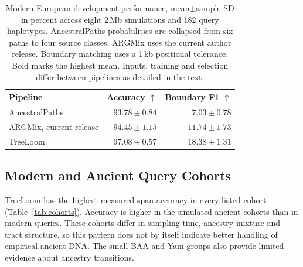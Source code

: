 \documentclass[letterpaper]{article}
\newcommand{\best}[1]{\mathbf{#1}}
\begin{document}
\begin{table}[t]
\centering
\small
\begin{tabular}{@{}lrr@{}}
\toprule
Pipeline & Accuracy $\uparrow$ & Boundary F1 $\uparrow$\\
\midrule
AncestralPaths &$93.78\pm0.84$&$7.03\pm0.78$\\
ARGMix, current release &$94.45\pm1.15$&$11.74\pm1.73$\\
TreeLoom &$\best{97.08\pm0.57}$&$\best{18.38\pm1.31}$\\
\bottomrule
\end{tabular}
\caption{Modern European development performance, mean$\pm$sample SD in percent across eight 2\,Mb simulations and 182 query haplotypes. AncestralPaths probabilities are collapsed from six paths to four source classes. ARGMix uses the current author release. Boundary matching uses a 1\,kb positional tolerance. Bold marks the highest mean. Inputs, training and selection differ between pipelines as detailed in the text.}
\label{tab:pipeline}
\end{table}

\subsection{Modern and Ancient Query Cohorts}
TreeLoom has the highest measured span accuracy in every listed cohort (Table~\ref{tab:cohorts}). Accuracy is higher in the simulated ancient cohorts than in modern queries. These cohorts differ in sampling time, ancestry mixture and tract structure, so this pattern does not by itself indicate better handling of empirical ancient DNA. The small BAA and Yam groups also provide limited evidence about ancestry transitions.
\end{document}
